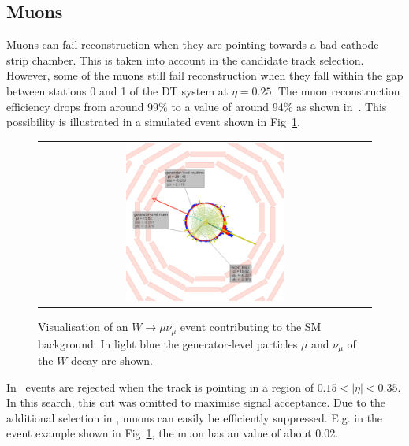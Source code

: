 \subsection*{Muons}
Muons can fail reconstruction when they are pointing towards a bad cathode strip chamber.
This is taken into account in the candidate track selection.
However, some of the muons still fail reconstruction when they fall within the gap between stations 0 and 1 of the DT system at $\eta=0.25$.
The muon reconstruction efficiency drops from around 99\% to a value of around 94\% as shown in~\cite{bib:CMS:DT_Thesis,bib:CMS:DT_8TeV_AN}.
This possibility is illustrated in a simulated event shown in Fig~\ref{fig:LostMuon}.
\begin{figure}[!tb]
  \centering 
  \begin{tabular}{c}
    \includegraphics[width=0.49\textwidth]{figures/analysis/LostMuon_Lumi_357583_Event_142918834.png}
  \end{tabular}
  \caption{Visualisation of an $W\rightarrow \mu\nu_{\mu}$ event contributing to the SM background. 
           In light blue the generator-level particles $\mu$ and $\nu_{\mu}$ of the $W$ decay are shown. }
  \label{fig:LostMuon}
\end{figure}
In~\cite{bib:CMS:DT_Thesis,bib:CMS:DT_8TeV_AN} events are rejected when the track is pointing in a region of $0.15<|\eta|<0.35$.
In this search, this cut was omitted to maximise signal acceptance. 
Due to the additional selection in \ias, muons can easily be efficiently suppressed.
E.g. in the event example shown in Fig~\ref{fig:LostMuon}, the muon has an \ias value of about 0.02.\\


